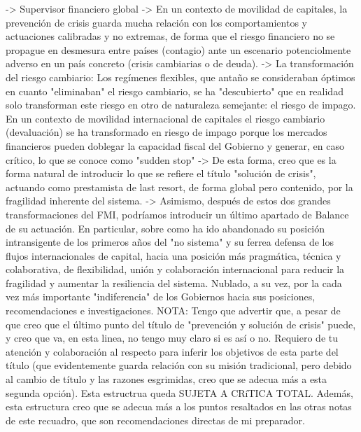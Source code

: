 \documentclass[10pt,a4paper]{article}
\begin{document}
{{    -> Supervisor financiero global -> En un contexto de movilidad de capitales, la prevención de crisis guarda mucha relación con los comportamientos y actuaciones calibradas y no extremas, de forma que el riesgo financiero no se propague en desmesura entre países (contagio) ante un escenario potenciolmente adverso en un país concreto (crisis cambiarias o de deuda).
    -> La transformación del riesgo cambiario: Los regímenes flexibles, que antaño se consideraban óptimos en cuanto "eliminaban" el riesgo cambiario, se ha "descubierto" que en realidad solo transforman este riesgo en otro de naturaleza semejante: el riesgo de impago. En un contexto de movilidad internacional de capitales el riesgo cambiario (devaluación) se ha transformado en riesgo de impago porque los mercados financieros pueden doblegar la capacidad fiscal del Gobierno y generar, en caso crítico, lo que se conoce como "sudden stop" -> De esta forma, creo que es la forma natural de introducir lo que se refiere el título "solución de crisis", actuando como prestamista de last resort, de forma global pero contenido, por la fragilidad inherente del sistema. 
    -> Asimismo, después de estos dos grandes transformaciones del FMI, podríamos introducir un último apartado de Balance de su actuación. En particular, sobre como ha ido abandonado su posición intransigente de los primeros años del "no sistema" y su ferrea defensa de los flujos internacionales de capital, hacia una posición más pragmática, técnica y colaborativa, de flexibilidad, unión y colaboración internacional para reducir la fragilidad y aumentar la resiliencia del sistema. Nublado, a su vez, por la cada vez más importante "indiferencia" de los Gobiernos hacia sus posiciones, recomendaciones e investigaciones. 
    NOTA: Tengo que advertir que, a pesar de que creo que el último punto del título de "prevención y solución de crisis" puede, y creo que va, en esta linea, no tengo muy claro si es así o no. Requiero de tu atención y colaboración al respecto para inferir los objetivos de esta parte del título (que evidentemente guarda relación con su misión tradicional, pero debido al cambio de título y las razones esgrimidas, creo que se adecua más a esta segunda opción). Esta estructrua queda SUJETA A CRíTICA TOTAL. Además, esta estructura creo que se adecua más a los puntos resaltados en las otras notas de este recuadro, que son recomendaciones directas de mi preparador.

}}
\end{document}
